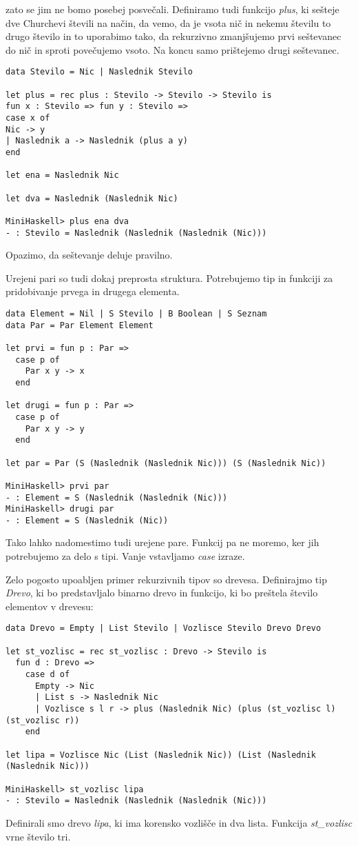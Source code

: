 \documentclass[12pt,a4paper,openany]{book}
\begin{document}
zato se jim ne bomo posebej posvečali. Definiramo tudi funkcijo \emph{plus}, ki sešteje dve Churchevi števili na način, da vemo, da je vsota nič in nekemu številu to drugo število in to uporabimo tako, da rekurzivno 
zmanjšujemo prvi seštevanec do nič in sproti povečujemo vsoto. Na koncu samo prištejemo drugi seštevanec.
\begin{lstlisting}
data Stevilo = Nic | Naslednik Stevilo

let plus = rec plus : Stevilo -> Stevilo -> Stevilo is
fun x : Stevilo => fun y : Stevilo =>
case x of
Nic -> y
| Naslednik a -> Naslednik (plus a y)
end

let ena = Naslednik Nic

let dva = Naslednik (Naslednik Nic)

MiniHaskell> plus ena dva
- : Stevilo = Naslednik (Naslednik (Naslednik (Nic)))
\end{lstlisting}
Opazimo, da seštevanje deluje pravilno. 

Urejeni pari so tudi dokaj preprosta struktura. Potrebujemo tip in funkciji za pridobivanje prvega in drugega elementa.
\begin{lstlisting}
data Element = Nil | S Stevilo | B Boolean | S Seznam
data Par = Par Element Element

let prvi = fun p : Par =>
  case p of 
    Par x y -> x
  end

let drugi = fun p : Par =>
  case p of 
    Par x y -> y
  end

let par = Par (S (Naslednik (Naslednik Nic))) (S (Naslednik Nic))

MiniHaskell> prvi par
- : Element = S (Naslednik (Naslednik (Nic)))
MiniHaskell> drugi par
- : Element = S (Naslednik (Nic))
\end{lstlisting}
Tako lahko nadomestimo tudi urejene pare. Funkcij pa ne moremo, ker jih potrebujemo za delo s tipi. Vanje vstavljamo \emph{case} izraze. 

Zelo pogosto upoabljen primer rekurzivnih tipov so drevesa. Definirajmo tip \emph{Drevo}, ki bo predstavljalo binarno drevo in funkcijo, ki bo preštela število elementov v drevesu:
\begin{lstlisting}	
data Drevo = Empty | List Stevilo | Vozlisce Stevilo Drevo Drevo

let st_vozlisc = rec st_vozlisc : Drevo -> Stevilo is
  fun d : Drevo =>
    case d of
      Empty -> Nic
      | List s -> Naslednik Nic
      | Vozlisce s l r -> plus (Naslednik Nic) (plus (st_vozlisc l) (st_vozlisc r))
    end

let lipa = Vozlisce Nic (List (Naslednik Nic)) (List (Naslednik (Naslednik Nic)))

MiniHaskell> st_vozlisc lipa
- : Stevilo = Naslednik (Naslednik (Naslednik (Nic)))
\end{lstlisting}
Definirali smo drevo \emph{lipa}, ki ima korensko vozlišče in dva lista. Funkcija \emph{st\_vozlisc} vrne število tri.
\end{document}
